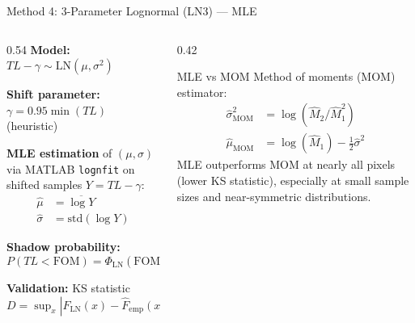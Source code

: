 \documentclass[aspectratio=169,12pt]{beamer}
\begin{document}
\begin{frame}{Method 4: 3-Parameter Lognormal (LN3) — MLE}
  \begin{columns}[T]
    \begin{column}{0.54\textwidth}
      \textbf{Model:} $TL - \gamma \sim \mathrm{LN}(\mu, \sigma^2)$

      \vspace{0.5em}
      \textbf{Shift parameter:} $\gamma = 0.95\min(TL)$ (heuristic)

      \vspace{0.5em}
      \textbf{MLE estimation} of $(\mu, \sigma)$ via MATLAB \texttt{lognfit}
      on shifted samples $Y = TL - \gamma$:
      \begin{align*}
        \hat\mu &= \overline{\log Y} \\
        \hat\sigma &= \mathrm{std}(\log Y)
      \end{align*}

      \vspace{0.5em}
      \textbf{Shadow probability:}
      \[
        P(TL < \mathrm{FOM}) = \Phi_\mathrm{LN}(\mathrm{FOM}-\gamma;\,\hat\mu,\hat\sigma)
      \]

      \vspace{0.5em}
      \textbf{Validation:} KS statistic $D = \sup_x |F_\mathrm{LN}(x) - \hat F_\mathrm{emp}(x)|$
    \end{column}
    \begin{column}{0.42\textwidth}
      \begin{block}{MLE vs MOM}
        Method of moments (MOM) estimator:
        \begin{align*}
          \hat\sigma^2_\mathrm{MOM} &= \log(\hat M_2/\hat M_1^2) \\
          \hat\mu_\mathrm{MOM} &= \log(\hat M_1) - \tfrac{1}{2}\hat\sigma^2
        \end{align*}
        \alert{MLE outperforms MOM} at nearly all pixels
        (lower KS statistic), especially at small sample sizes
        and near-symmetric distributions.
      \end{block}
    \end{column}
  \end{columns}
\end{frame}
\end{document}
